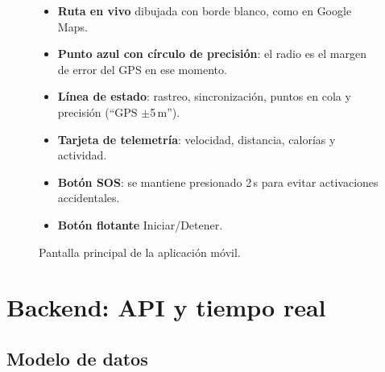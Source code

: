\documentclass[11pt]{article}
\begin{document}
\begin{figure}[H]
{}
\hspace{0.8cm}
\begin{minipage}[b]{0.55\linewidth}\small
\begin{itemize}
  \item \textbf{Ruta en vivo} dibujada con borde blanco, como en Google Maps.
  \item \textbf{Punto azul con círculo de precisión}: el radio es el margen de error del GPS en ese momento.
  \item \textbf{Línea de estado}: rastreo, sincronización, puntos en cola y precisión (``GPS $\pm$5\,m'').
  \item \textbf{Tarjeta de telemetría}: velocidad, distancia, calorías y actividad.
  \item \textbf{Botón SOS}: se mantiene presionado 2\,s para evitar activaciones accidentales.
  \item \textbf{Botón flotante} Iniciar/Detener.
\end{itemize}
\vspace{1.5cm}
\end{minipage}
\caption{Pantalla principal de la aplicación móvil.}
\end{figure}

\section{Backend: API y tiempo real}

\subsection{Modelo de datos}
\end{document}
